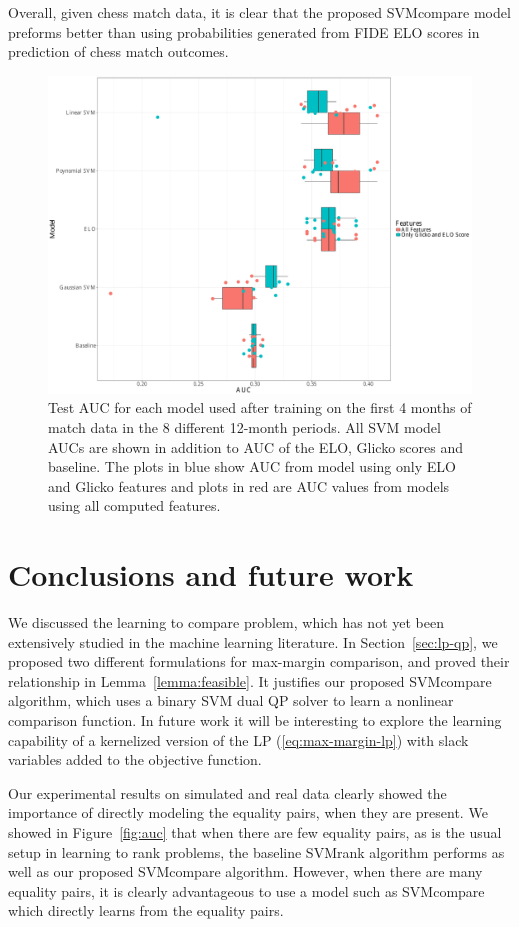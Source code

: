 \documentclass[twoside,11pt]{article}
\newcommand{\changed}[1]{
  #1
}
\begin{document}
Overall, given chess match data, it is clear that the proposed SVMcompare model preforms better than using probabilities generated from FIDE ELO scores in prediction of chess match outcomes.

\begin{figure}[!b]
	\includegraphics[width=120mm]{AUC_chess.pdf}
	\centering
	\caption{Test AUC for each model used after training on the first 4 months of match data in the 8 different 12-month periods.  All SVM model AUCs are shown in addition to AUC of the ELO, Glicko scores and baseline.  The plots in blue show AUC from model using only ELO and Glicko features and plots in red are AUC values from models using all computed features.}
	\label{fig6}
\end{figure}

\section{Conclusions and future work}
\label{sec:conclusions}

We discussed the learning to compare problem, which has not yet been
extensively studied in the machine learning literature. In
Section~\ref{sec:lp-qp}, we proposed two different formulations for
max-margin comparison, and proved their relationship in
Lemma~\ref{lemma:feasible}. It justifies our proposed SVMcompare
algorithm, which uses a binary SVM dual QP solver to learn a nonlinear
comparison function. \changed{In future work it will be interesting to explore
the learning capability of a kernelized version of the LP
(\ref{eq:max-margin-lp}) with slack variables added to the objective
function.}

Our experimental results on simulated and real data clearly showed the
importance of directly modeling the equality pairs, when they are
present. We showed in Figure~\ref{fig:auc} that when there are few
equality pairs, as is the usual setup in learning to rank problems,
the baseline SVMrank algorithm performs as well as our proposed
SVMcompare algorithm. However, when there are many equality pairs, it
is clearly advantageous to use a model such as SVMcompare which
directly learns from the equality pairs.
\end{document}
